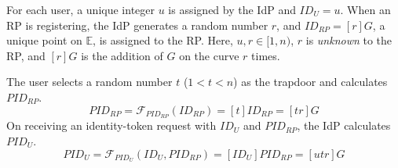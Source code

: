 For each user,
           a unique integer $u$ is assigned by the IdP and $ID_U = u$.
When an RP is registering,
            the IdP generates a random number $r$, and $ID_{RP} = [r]G$, a unique point on $\mathbb{E}$, is assigned to the RP.
Here,
$u, r \in [1,n)$, $r$ is \emph{unknown} to the RP, and $[r]G$ is the addition of $G$ on the curve $r$ times.

\vspace{0.8mm}
 The user selects a random number $t$ ($1 < t <n$) as the trapdoor
         and calculates $PID_{RP}$.
\begin{equation}
PID_{RP} = \mathcal{F}_{PID_{RP}}(ID_{RP}) = [t]{ID_{RP}} = [tr]G
\label{equ:PIDRP}
\end{equation}
%
%
%
On receiving an identity-token request with $ID_U$ and $PID_{RP}$,
    the IdP calculates $PID_{U}$.
\begin{equation}
PID_{U} = \mathcal{F}_{PID_U}(ID_U, PID_{RP}) =
  [{ID_U}]{PID_{RP}} = [utr]G
 \label{equ:PIDU}
\end{equation}


